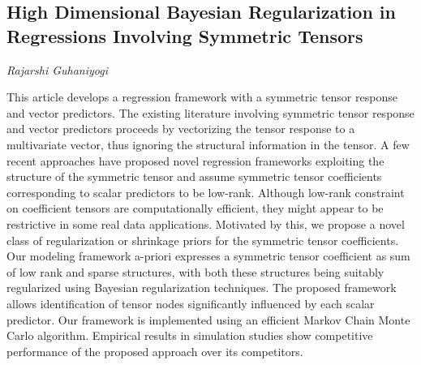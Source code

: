 \documentclass[../booklet.tex]{subfiles}
\begin{document}
\subsection[High Dimensional Bayesian Regularization in Regressions Involving Symmetric Tensors. {\it Rajarshi Guhaniyogi}]{High Dimensional Bayesian Regularization in Regressions Involving Symmetric Tensors}

\begin{center}
  {\it Rajarshi Guhaniyogi}
\end{center}



This article develops a regression framework with a symmetric tensor response and vector predictors. The existing literature involving symmetric tensor response and vector predictors proceeds by vectorizing the tensor response to a multivariate vector, thus ignoring the structural information in the tensor. A few recent approaches have proposed novel regression frameworks exploiting the structure of the symmetric tensor and assume symmetric tensor coefficients corresponding to scalar predictors to be low-rank. Although low-rank constraint on coefficient tensors are computationally efficient, they might appear to be restrictive in some real data applications.  Motivated by this, we propose a novel class of regularization or shrinkage priors for the symmetric tensor coefficients. Our modeling framework a-priori expresses a symmetric tensor coefficient as sum of low rank and sparse structures, with both these structures being suitably regularized using Bayesian regularization techniques. The proposed framework allows identification of tensor nodes significantly influenced by each scalar predictor. Our framework is implemented using an efficient Markov Chain Monte Carlo algorithm. Empirical results in simulation studies show competitive performance of the proposed approach over its competitors.

\end{document}
